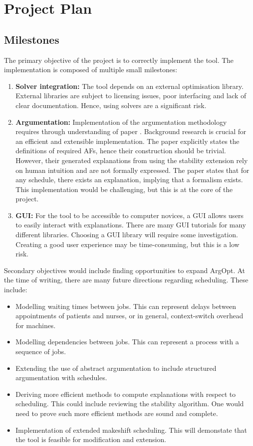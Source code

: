 \chapter{Project Plan}

\section{Milestones}

The primary objective of the project is to correctly implement the tool. The implementation is composed of multiple small milestones:

\begin{enumerate}
	\item\textbf{Solver integration:} The tool depends on an external optimisation library. External libraries are subject to licensing issues, poor interfacing and lack of clear documentation. Hence, using solvers are a significant risk.
	\item\textbf{Argumentation:} Implementation of the argumentation methodology requires through understanding of paper \cite{aes}. Background research is crucial for an efficient and extensible implementation. The paper explicitly states the definitions of required AFs, hence their construction should be trivial. However, their generated explanations from using the stability extension rely on human intuition and are not formally expressed. The paper states that for any schedule, there exists an explanation, implying that a formalism exists. This implementation would be challenging, but this is at the core of the project.
	\item\textbf{GUI:} For the tool to be accessible to computer novices, a GUI allows users to easily interact with explanations. There are many GUI tutorials for many different libraries. Choosing a GUI library will require some investigation. Creating a good user experience may be time-consuming, but this is a low risk.
\end{enumerate}

Secondary objectives would include finding opportunities to expand ArgOpt. At the time of writing, there are many future directions regarding scheduling. These include:
\begin{itemize}
	\item Modelling waiting times between jobs. This can represent delays between appointments of patients and nurses, or in general, context-switch overhead for machines.
	\item Modelling dependencies between jobs. This can represent a process with a sequence of jobs.
	\item Extending the use of abstract argumentation to include structured argumentation with schedules.
	\item Deriving more efficient methods to compute explanations with respect to scheduling. This could include reviewing the stability algorithm. One would need to prove such more efficient methods are sound and complete.
	\item Implementation of extended makeshift scheduling. This will demonstate that the tool is feasible for modification and extension.
\end{itemize}